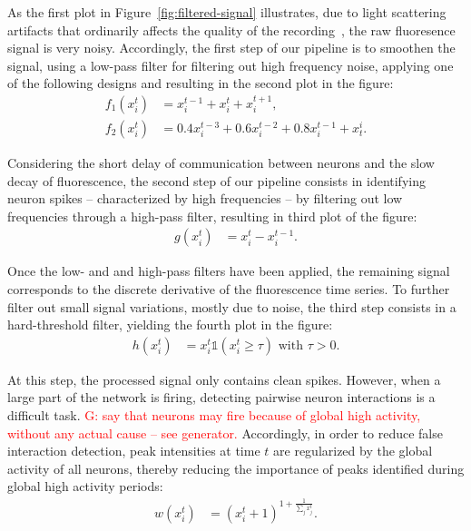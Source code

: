 \documentclass[wcp]{jmlr}
\begin{document}
As the first plot in Figure~\ref{fig:filtered-signal} illustrates, due to
light scattering artifacts that ordinarily affects the quality of the
recording~\citep{lichtman2011big}, the raw fluoresence signal is very noisy.
Accordingly, the first step of our pipeline is to smoothen the signal, using a low-pass filter for
filtering out high frequency noise, applying one of the following designs and
resulting in the second plot in the figure:
\begin{align}
f_1(x^t_i) &= x^{t-1}_i + x^{t}_i + x^{t+1}_i \label{eq:symetric-median}, \\
f_2(x^t_i) &= 0.4 x^{t-3}_i + 0.6 x^{t-2}_i + 0.8 x^{t-1}_i + x_{t}^i.
\label{eq:weighted-asymetric-median}
\end{align}

Considering the short delay of communication between neurons and the slow
decay of fluorescence, the second step of our pipeline consists in identifying
neuron spikes -- characterized by high frequencies -- by filtering out low
frequencies through a high-pass filter, resulting in third plot of the figure:
\begin{align} %
g(x^{t}_{i}) &= x^{t}_i - x^{t-1}_i. \label{eq:high-pass-filter}
\end{align}

Once the low- and and high-pass filters have been applied, the remaining signal
corresponds to the discrete derivative of the fluorescence time series. To
further filter out small signal variations, mostly due to noise, the third step
consists in a  hard-threshold filter, yielding the fourth plot in the figure:
\begin{align}
h(x^{t}_i) &= x^{t}_i \mathbb{1}(x^{t}_i \geq \tau) \text{ with } \tau > 0.
\end{align}

At this step, the processed signal only contains clean spikes. However, when a
large part of the network is firing, detecting pairwise neuron interactions is a
difficult task. \textcolor{red}{G: say that neurons may fire because of global
high activity, without any actual cause -- see generator.}
Accordingly, in order to reduce false interaction detection,
peak intensities at time $t$ are regularized by the global activity of all
neurons, thereby reducing the importance of peaks identified during global high activity periods:
\begin{align}
 w(x^{t}_i) &= (x^{t}_i + 1 )^{1 + \frac{1}{\sum_{j} x^{t}_j}}.
\end{align}
\end{document}
